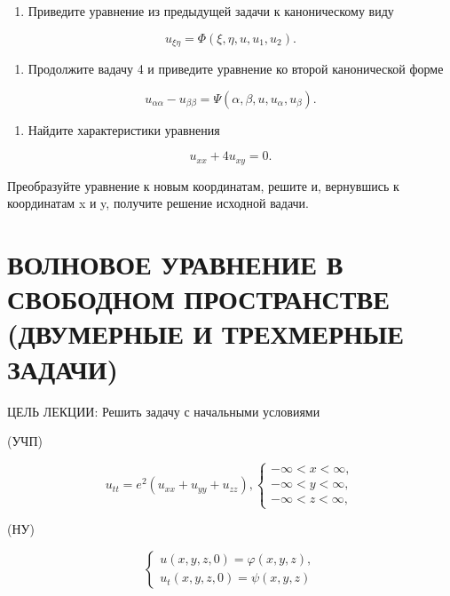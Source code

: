 \documentclass[
  ukrainian,
]{article}
\providecommand{\tightlist}{%
  \setlength{\itemsep}{0pt}\setlength{\parskip}{0pt}}
\begin{document}
\begin{enumerate}
\def\labelenumi{\arabic{enumi}.}
\setcounter{enumi}{3}
\tightlist
\item
  Приведите уравнение из предыдущей задачи к каноническому виду
\end{enumerate}

\[
u_{\xi\eta} = \Phi(\xi, \eta, u, u_1, u_2).
\]

\begin{enumerate}
\def\labelenumi{\arabic{enumi}.}
\setcounter{enumi}{4}
\tightlist
\item
  Продолжите вадачу 4 и приведите уравнение ко второй канонической форме
\end{enumerate}

\[
u_{\alpha\alpha} - u_{\beta\beta} = \Psi(\alpha, \beta, u, u_{\alpha}, u_{\beta}).
\]

\begin{enumerate}
\def\labelenumi{\arabic{enumi}.}
\setcounter{enumi}{5}
\tightlist
\item
  Найдите характеристики уравнения
\end{enumerate}

\[
u_{xx} + 4u_{xy} = 0.
\]

Преобразуйте уравнение к новым координатам, решите и, вернувшись к
координатам x и y, получите решение исходной вадачи.

\section{ВОЛНОВОЕ УРАВНЕНИЕ В СВОБОДНОМ ПРОСТРАНСТВЕ (ДВУМЕРНЫЕ И
ТРЕХМЕРНЫЕ
ЗАДАЧИ)}\label{ux432ux43eux43bux43dux43eux432ux43eux435-ux443ux440ux430ux432ux43dux435ux43dux438ux435-ux432-ux441ux432ux43eux431ux43eux434ux43dux43eux43c-ux43fux440ux43eux441ux442ux440ux430ux43dux441ux442ux432ux435-ux434ux432ux443ux43cux435ux440ux43dux44bux435-ux438-ux442ux440ux435ux445ux43cux435ux440ux43dux44bux435-ux437ux430ux434ux430ux447ux438}

ЦЕЛЬ ЛЕКЦИИ: Решить задачу с начальными условиями

(УЧП)

\[
u_{tt} = e^{2} (u_{xx} + u_{yy} + u_{zz}),
\begin{cases} -\infty < x < \infty, \\ -\infty < y < \infty, \\ -\infty < z < \infty, \end{cases}
\]

(НУ)

\[
\begin{cases} u(x, y, z, 0) = \varphi(x, y, z), \\ u_{t}(x, y, z, 0) = \psi(x, y, z) \end{cases}
\]
\end{document}
